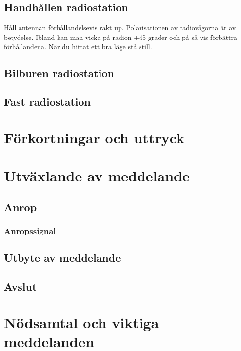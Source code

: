 \documentclass[12ypt,swedish,a4paper]{report}
\begin{document}
\subsection{Handhållen radiostation}

Håll antennan förhållandelsevis rakt up. Polarisationen av radiovågorna är av betydelse. Ibland kan man vicka på radion $\pm$45 grader och på så vis förbättra förhållandena. När du hittat ett bra läge stå still. 

\subsection{Bilburen radiostation}


\subsection{Fast radiostation}


\section{Förkortningar och uttryck}

\section{Utväxlande av meddelande}

\subsection{Anrop}

\subsubsection{Anropssignal}

\subsection{Utbyte av meddelande}

\subsection{Avslut}

\section{Nödsamtal och viktiga meddelanden}
\end{document}
